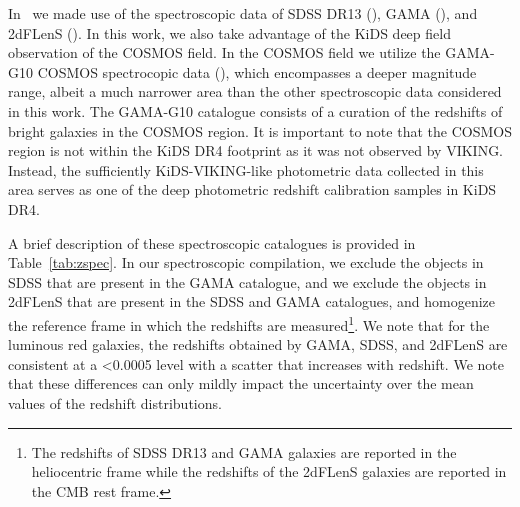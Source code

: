 \documentclass{aa}
\numberwithin{equation}{section}
\newcommand{\mb}{\textcolor{brown}}
\begin{document}
In~\citet{vakili2019} we made use of the spectroscopic data of SDSS DR13 (\citealt{sdss_dr13}), GAMA (\citealt{driver2011}), and 2dFLenS (\citealt{blake2016}). In this work, we also take advantage of the KiDS deep field observation of the COSMOS field. In the COSMOS field we utilize the GAMA-G10 COSMOS spectrocopic data (\citealt{davis2017}), which encompasses a deeper magnitude range, albeit a much narrower area than the other spectroscopic data considered in this work. The GAMA-G10 catalogue consists of a curation of the redshifts of bright galaxies in the COSMOS region. 
It is important to note that the COSMOS region is not within the KiDS DR4 footprint as it was not observed by VIKING. Instead, the sufficiently KiDS-VIKING-like photometric data collected in this area serves as one of the deep photometric redshift calibration samples in KiDS DR4. 


A brief description of these spectroscopic catalogues is provided in Table~\ref{tab:zspec}. In our spectroscopic compilation, we exclude the objects in SDSS that are present in the GAMA catalogue, and we exclude the objects in 2dFLenS that are present in the SDSS and GAMA catalogues, and homogenize the reference frame in which the redshifts are measured\footnote{The redshifts of SDSS DR13 and GAMA galaxies are reported in the heliocentric frame while the redshifts of the 2dFLenS galaxies are reported in the CMB rest frame.}. We note that for the luminous red galaxies, the redshifts obtained by GAMA, SDSS, and 2dFLenS are consistent at a <0.0005 level with a scatter that increases with redshift. We note that these differences can only mildly impact the uncertainty over the mean values of the redshift distributions.
\end{document}
